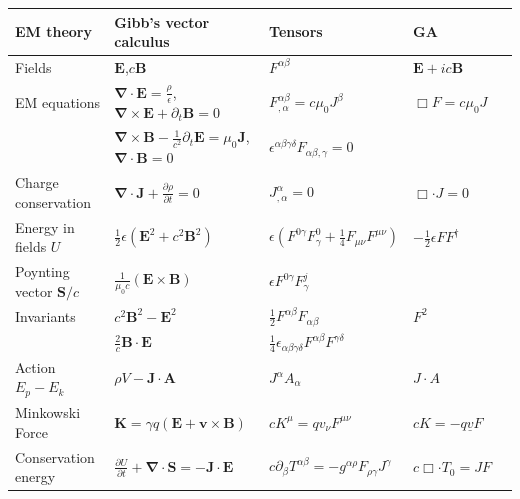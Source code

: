 \documentclass[12pt,aps,prb,preprint]{revtex4}   %
\newcommand{\iGA}{{i}}
\begin{document}
\begin{table}
	\centering

\begin{tabular}{|l|l|l|l|l|}
\hline
 EM theory  & Gibb's vector calculus & Tensors & GA  \\
\hline \hline
Fields & $ \textbf{E} $,$ c \mathbf{B} $ & $ F^{\alpha \beta} $ &  $ \mathbf{E} + \iGA c \mathbf{B}  $  \\
EM equations & $ \mathbf{\nabla} \cdot \mathbf{E}  = \frac{\rho}{\epsilon} $, $\mathbf{\nabla} \times \mathbf{E} +  \partial_t \mathbf{B}  =  0 $ &  $  F^{\alpha \beta }_{, \alpha} = c \mu_0 J^{\beta} $ &  $ \Box F = c \mu_0 J $ \\
 & $\mathbf{\nabla} \times \mathbf{B} - \frac{1}{c^2} \partial_t \mathbf{E} = \mu_0 \mathbf{J} $, $ \mathbf{\nabla} \cdot \mathbf{B}  =  0 $ &  $ \epsilon^{\alpha \beta \gamma \delta} F_{\alpha \beta , \gamma} = 0 $   &   \\
Charge conservation & $ \mathbf{\nabla} \cdot \mathbf{J} + \frac{\partial \rho }{\partial t} = 0 $ & $ J^{\alpha}_{, \alpha } = 0 $ & $ \Box \cdot J = 0 $ \\
Energy in fields $U$ & $ \frac{1}{2} \epsilon ( \mathbf{E}^2 + c^2 \mathbf{B}^2 ) $ & $  \epsilon (F^{0 \gamma} F^{0}_{\gamma} + \frac{1}{4} F_{\mu \nu}  F^{\mu \nu} ) $ &  $ -\frac{1}{2} \epsilon F F^{\dagger} $  \\
Poynting vector $\mathbf{S}/c$ & $ \frac{1}{\mu_0 c} (\mathbf{E} \times \mathbf{B}) $ &  $ \epsilon F^{0 \gamma} F^{j}_{\gamma}  $ &   \\
Invariants & $ c^2 \mathbf{B}^2 - \mathbf{E}^2 $ & $ \frac{1}{2} F^{\alpha \beta} F_{\alpha \beta} $ &  $ F^2 $  \\
         & $ \frac{2}{c} \mathbf{B} \cdot \mathbf{E} $ & $ \frac{1}{4} \epsilon_{\alpha \beta \gamma \delta} F^{\alpha \beta} F^{\gamma \delta} $ &   \\
Action $ E_p - E_k $ & $ \rho V - \textbf{J} \cdot \mathbf{A} $ & $ J^{\alpha} A_{\alpha} $ &  $ J \cdot A $  \\
Minkowski Force & $ \mathbf{K} = \gamma q(\mathbf{E}+\mathbf{v} \times \textbf{B}) $ & $ c K^{\mu} = q v_{\nu} F^{\mu \nu } $ &  $ c K =  - q \underline{v} F  $  \\
Conservation energy & $ \frac{\partial U }{\partial t} + \mathbf{\nabla} \cdot \mathbf{S} = -\textbf{J} \cdot \mathbf{E}  $ & $ c \partial_{\beta} T^{\alpha \beta} = - g^{\alpha \rho} F_{\rho \gamma } J^{\gamma} $ &  $ c \Box \cdot T_0 = J F $  \\

\end{tabular}
\end{table}
\end{document}
